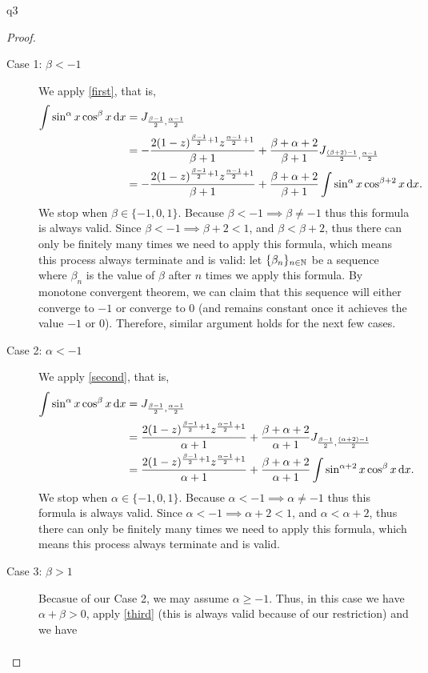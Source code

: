 \documentclass[reqno]{alittlebear}
\begin{document}
\begin{exercise}{}{}
\begin{question}{}{q3}
\begin{proof}
            \begin{description}
                \item[Case 1: $\beta<-1$] We apply \eqref{first}, that is, \begin{align*}
                    \int\sin^\alpha x\cos^\beta x\mathop{}\!\mathrm{d} x&= J_{\frac{\beta-1}{2},\frac{\alpha-1}{2}}\\
                    &=-\frac{2(1-z)^{\frac{\beta-1}{2}+1}z^{\frac{\alpha-1}{2}+1}}{\beta+1}+\frac{\beta+\alpha+2}{\beta+1}J_{\frac{(\beta+2)-1}{2},\frac{\alpha-1}{2}}\\
                    &=-\frac{2(1-z)^{\frac{\beta-1}{2}+1}z^{\frac{\alpha-1}{2}+1}}{\beta+1}+\frac{\beta+\alpha+2}{\beta+1}\int\sin^\alpha x\cos^{\beta+2} x\mathop{}\!\mathrm{d} x.
                \end{align*}
                We stop when $\beta\in\{-1,0,1\}$. Because $\beta<-1\implies \beta\neq-1$ thus this formula is always valid. Since $\beta<-1\implies\beta+2<1$, and $\beta<\beta+2$, thus there can only be finitely many times we need to apply this formula, which means this process always terminate and is valid: let $\{\beta_n\}_{n\in\mathbb{N}}$ be a sequence where $\beta_n$ is the value of $\beta$ after $n$ times we apply this formula. By monotone convergent theorem, we can claim that this sequence will either converge to $-1$ or converge to $0$ (and remains constant once it achieves the value $-1$ or $0$). Therefore, similar argument holds for the next few cases.
                \item[Case 2: $\alpha<-1$]  We apply \eqref{second}, that is, \begin{align*}
                    \int\sin^\alpha x\cos^\beta x\mathop{}\!\mathrm{d} x &= J_{\frac{\beta-1}{2},\frac{\alpha-1}{2}}\\
                    &=\frac{2(1-z)^{\frac{\beta-1}{2}+1}z^{\frac{\alpha-1}{2}+1}}{\alpha+1}+\frac{\beta+\alpha+2}{\alpha+1}J_{\frac{\beta-1}{2},\frac{(\alpha+2)-1}{2}}\\
                    &=\frac{2(1-z)^{\frac{\beta-1}{2}+1}z^{\frac{\alpha-1}{2}+1}}{\alpha+1}+\frac{\beta+\alpha+2}{\alpha+1}\int\sin^{\alpha+2} x\cos^{\beta} x\mathop{}\!\mathrm{d} x.
                \end{align*}
                We stop when $\alpha\in\{-1,0,1\}$. Because $\alpha<-1\implies \alpha\neq-1$ thus this formula is always valid. Since $\alpha<-1\implies\alpha+2<1$, and $\alpha<\alpha+2$, thus there can only be finitely many times we need to apply this formula, which means this process always terminate and is valid.
                \item[Case 3: $\beta>1$] Becasue of our Case 2, we may assume $\alpha\geq-1$. Thus, in this case we have $\alpha+\beta>0$, apply \eqref{third} (this is always valid because of our restriction) and we have \begin{align*}

\end{align*}
\end{description}
\end{proof}
\end{question}
\end{exercise}
\end{document}
